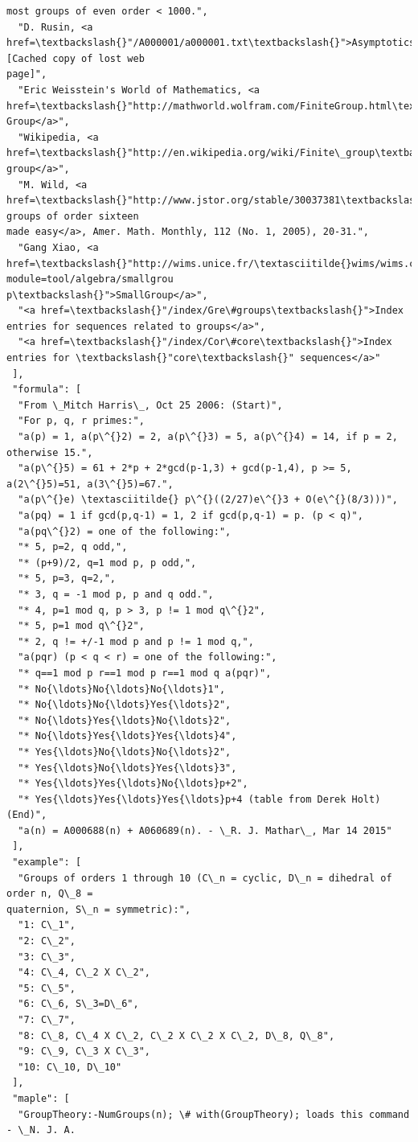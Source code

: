 \documentclass[11pt]{article}
\begin{document}
\begin{Verbatim}[commandchars=\\\{\}]
most groups of even order < 1000.",
  "D. Rusin, <a href=\textbackslash{}"/A000001/a000001.txt\textbackslash{}">Asymptotics</a> [Cached copy of lost web
page]",
  "Eric Weisstein's World of Mathematics, <a
href=\textbackslash{}"http://mathworld.wolfram.com/FiniteGroup.html\textbackslash{}">Finite Group</a>",
  "Wikipedia, <a href=\textbackslash{}"http://en.wikipedia.org/wiki/Finite\_group\textbackslash{}">Finite group</a>",
  "M. Wild, <a href=\textbackslash{}"http://www.jstor.org/stable/30037381\textbackslash{}">The groups of order sixteen
made easy</a>, Amer. Math. Monthly, 112 (No. 1, 2005), 20-31.",
  "Gang Xiao, <a href=\textbackslash{}"http://wims.unice.fr/\textasciitilde{}wims/wims.cgi?module=tool/algebra/smallgrou
p\textbackslash{}">SmallGroup</a>",
  "<a href=\textbackslash{}"/index/Gre\#groups\textbackslash{}">Index entries for sequences related to groups</a>",
  "<a href=\textbackslash{}"/index/Cor\#core\textbackslash{}">Index entries for \textbackslash{}"core\textbackslash{}" sequences</a>"
 ],
 "formula": [
  "From \_Mitch Harris\_, Oct 25 2006: (Start)",
  "For p, q, r primes:",
  "a(p) = 1, a(p\^{}2) = 2, a(p\^{}3) = 5, a(p\^{}4) = 14, if p = 2, otherwise 15.",
  "a(p\^{}5) = 61 + 2*p + 2*gcd(p-1,3) + gcd(p-1,4), p >= 5, a(2\^{}5)=51, a(3\^{}5)=67.",
  "a(p\^{}e) \textasciitilde{} p\^{}((2/27)e\^{}3 + O(e\^{}(8/3)))",
  "a(pq) = 1 if gcd(p,q-1) = 1, 2 if gcd(p,q-1) = p. (p < q)",
  "a(pq\^{}2) = one of the following:",
  "* 5, p=2, q odd,",
  "* (p+9)/2, q=1 mod p, p odd,",
  "* 5, p=3, q=2,",
  "* 3, q = -1 mod p, p and q odd.",
  "* 4, p=1 mod q, p > 3, p != 1 mod q\^{}2",
  "* 5, p=1 mod q\^{}2",
  "* 2, q != +/-1 mod p and p != 1 mod q,",
  "a(pqr) (p < q < r) = one of the following:",
  "* q==1 mod p r==1 mod p r==1 mod q a(pqr)",
  "* No{\ldots}No{\ldots}No{\ldots}1",
  "* No{\ldots}No{\ldots}Yes{\ldots}2",
  "* No{\ldots}Yes{\ldots}No{\ldots}2",
  "* No{\ldots}Yes{\ldots}Yes{\ldots}4",
  "* Yes{\ldots}No{\ldots}No{\ldots}2",
  "* Yes{\ldots}No{\ldots}Yes{\ldots}3",
  "* Yes{\ldots}Yes{\ldots}No{\ldots}p+2",
  "* Yes{\ldots}Yes{\ldots}Yes{\ldots}p+4 (table from Derek Holt) (End)",
  "a(n) = A000688(n) + A060689(n). - \_R. J. Mathar\_, Mar 14 2015"
 ],
 "example": [
  "Groups of orders 1 through 10 (C\_n = cyclic, D\_n = dihedral of order n, Q\_8 =
quaternion, S\_n = symmetric):",
  "1: C\_1",
  "2: C\_2",
  "3: C\_3",
  "4: C\_4, C\_2 X C\_2",
  "5: C\_5",
  "6: C\_6, S\_3=D\_6",
  "7: C\_7",
  "8: C\_8, C\_4 X C\_2, C\_2 X C\_2 X C\_2, D\_8, Q\_8",
  "9: C\_9, C\_3 X C\_3",
  "10: C\_10, D\_10"
 ],
 "maple": [
  "GroupTheory:-NumGroups(n); \# with(GroupTheory); loads this command - \_N. J. A.

\end{Verbatim}
\end{document}

